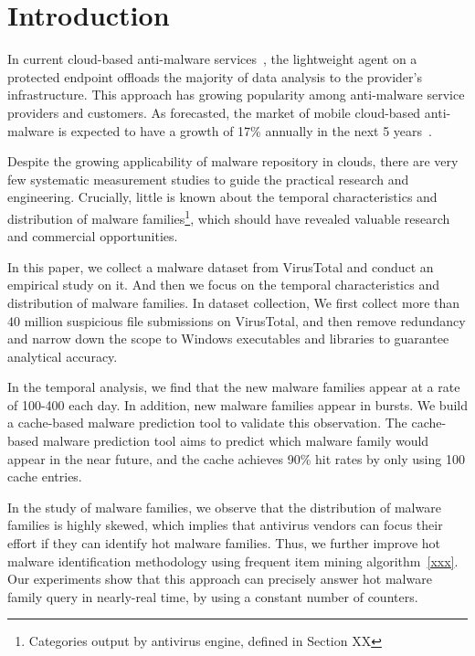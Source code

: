\section{Introduction}
In current cloud-based anti-malware services~\cite{xxx}, the lightweight agent on a protected endpoint offloads the majority of data analysis to the provider's infrastructure. This approach has growing popularity among anti-malware service providers and customers. As forecasted, the market of mobile cloud-based anti-malware is expected to have a growth of 17\% annually in the next 5 years~\cite{report2016}.

Despite the growing applicability of malware repository in clouds, there are very few systematic measurement studies to guide the practical research and engineering. Crucially, little is known about the temporal characteristics and distribution of malware families\footnote{Categories output by antivirus engine, defined in Section XX}, which should have revealed valuable research and commercial opportunities.

In this paper, we collect a malware dataset from VirusTotal and conduct an empirical study on it. And then we focus on the temporal characteristics and distribution of malware families. In dataset collection, We first collect more than 40 million suspicious file submissions on VirusTotal, and then remove redundancy and narrow down the scope to Windows executables and libraries to guarantee analytical accuracy.

In the temporal analysis, we find that the new malware families appear at a rate of 100-400 each day. In addition, new malware families appear in bursts. We build a cache-based malware prediction tool to validate this observation. The cache-based malware prediction tool aims to predict which malware family would appear in the near future, and the cache achieves 90\% hit rates by only using 100 cache entries.

In the study of malware families, we observe that the distribution of malware families is highly skewed, which implies that antivirus vendors can focus their effort if they can identify hot malware families.
Thus, we further improve hot malware identification methodology using frequent item mining algorithm~\ref{xxx}.
Our experiments show that this approach can precisely answer hot malware family query in nearly-real time, by using a constant number of counters. 

